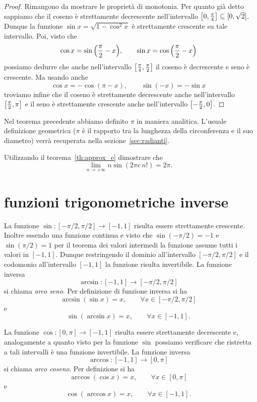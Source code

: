 \begin{proof}
Rimangono da mostrare le proprietà di monotonia.
Per quanto già detto sappiamo
che il coseno è strettamente
decrescente nell'intervallo
${\left[ 0,\frac \pi 4 \right]}\subseteq [0,\sqrt 2]$.
Dunque la funzione $\sin x = \sqrt{1-\cos^2 x}$
è strettamente crescente su tale intervallo.
Poi, visto che
\[
 \cos x  = \sin{\left( \frac \pi 2 - x \right)},
 \qquad
 \sin x = \cos{\left( \frac \pi 2 - x \right)}
\]
possiamo dedurre che anche nell'intervallo
${\left[ \frac \pi 4, \frac \pi 2 \right]}$
il coseno è decrescente e seno è crescente.
Ma usando anche
\[
\cos x = -\cos(\pi-x), \qquad \sin(-x)=-\sin x
\]
troviamo infine che il coseno è strettamente
decrescente anche
nell'intervallo ${\left[ \frac \pi 2, \pi \right]}$
e il seno è strettamente crescente anche
nell'intervallo ${\left[ -\frac \pi 2, 0 \right]}$.
\end{proof}

Nel teorema precedente abbiamo definito $\pi$ in maniera analitica.
L'usuale definizione geometrica ($\pi$ è il rapporto tra la lunghezza della
circonferenza e il suo diametro) verrà recuperata nella sezione~\ref{sec:radianti}.

\begin{exercise}
  Utilizzando il teorema~\ref{th:approx_e} dimostrare che
  \[
  \lim_{n\to +\infty} n \sin(2\pi e\, n!) = 2\pi.
  \]
\end{exercise}


\section{funzioni trigonometriche inverse}
La funzione $\sin\colon[-\pi/2,\pi/2]\to [-1,1]$ risulta essere strettamente crescente. Inoltre essendo una funzione continua e visto che $\sin(-\pi/2)=-1$
e $\sin(\pi/2) = 1$ per il  teorema dei valori intermedi
la funzione assume tutti i valori in $[-1,1]$.
Dunque restringendo il dominio all'intervallo $[-\pi/2, \pi/2]$
e il codomonio all'intervallo $[-1,1]$ la funzione risulta invertibile.
La funzione inversa
\[
  \arcsin\colon[-1,1]\to [-\pi/2, \pi/2]
\]
si chiama \emph{arco seno}. Per definizione di funzione inversa si ha
\[
  \arcsin(\sin x) = x, \qquad \forall x \in [-\pi/2, \pi/2]
\]
e
\[
  \sin(\arcsin x) = x, \qquad \forall x \in [-1, 1].
\]

La funzione $\cos \colon[0,\pi] \to [-1,1]$ risulta essere strettamente
decrescente e, analogamente a quanto visto per la funzione $\sin$
possiamo verificare che ristretta a tali intervalli è una funzione invertibile.
La funzione inversa
\[
  \arccos\colon[-1,1] \to [0,\pi]
\]
si chiama \emph{arco coseno}. Per definizione si ha
\[
  \arccos(\cos x) = x, \qquad \forall x \in [0,\pi]
\]
e
\[
   \cos(\arccos x) = x, \qquad \forall x \in [-1,1].
\]

